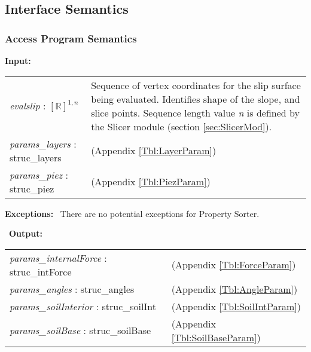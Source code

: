 \documentclass[12pt]{article}
\begin{document}
\subsection{Interface Semantics}

\subsubsection{Access Program Semantics}
\textbf{Input:}
\renewcommand*{\arraystretch}{1.5}
\begin{longtable}{p{} p{}}
  \textit{evalslip} : $[\mathbb{R}]^{1,n}$ & Sequence of vertex
  coordinates for the slip surface being evaluated. Identifies shape
  of the slope, and slice points. Sequence length value \textit{n} is
  defined by the Slicer module (section \ref{sec:SlicerMod}).  \\

  \textit{params\_layers} : struc\_layers & (Appendix
  \ref{Tbl:LayerParam}) \\
  
  \textit{params\_piez} : struc\_piez & (Appendix \ref{Tbl:PiezParam})
  \\
\end{longtable}

\noindent \textbf{Exceptions:} ~\newline\noindent There are no
potential exceptions for Property Sorter.

~\newline\noindent \textbf{Output:}
\renewcommand*{\arraystretch}{1.5}
\begin{longtable}{p{} p{}}
  \textit{params\_internalForce} : struc\_intForce & (Appendix
  \ref{Tbl:ForceParam})\\
  
  \textit{params\_angles} : struc\_angles & (Appendix \ref{Tbl:AngleParam})\\

  \textit{params\_soilInterior} : struc\_soilInt & (Appendix
  \ref{Tbl:SoilIntParam})\\

  \textit{params\_soilBase} : struc\_soilBase & (Appendix
  \ref{Tbl:SoilBaseParam})\\
\end{longtable}

\end{document}
